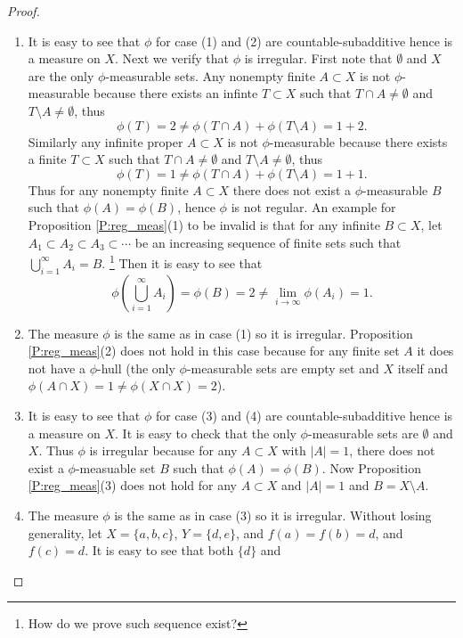 \begin{proof}
\begin{enumerate}
  \item It is easy to see that $\phi$ for case (1) and (2) are
    countable-subadditive hence is a measure on $X$. Next we verify that $\phi$
    is irregular. First note that $\emptyset$ and $X$ are the only
    $\phi$-measurable sets. Any nonempty finite $A\subset X$ is not
    $\phi$-measurable because there exists an infinte $T\subset X$ such that 
    $T\cap A\neq \emptyset$ and $T\setminus A\neq \emptyset$, thus 
    \[
      \phi(T)=2\neq \phi(T\cap A)+\phi(T\setminus A)=1+2.
    \]
    Similarly any infinite proper $A\subset X$ is not $\phi$-measurable because
    there exists a finite $T\subset X$ such that
    $T\cap A\neq \emptyset$ and $T\setminus A\neq \emptyset$, thus 
    \[
      \phi(T)=1\neq \phi(T\cap A)+\phi(T\setminus A)=1+1.
    \]
    Thus for any nonempty finite $A \subset X$ there does not exist a 
    $\phi$-measurable $B$ such that $\phi(A)=\phi(B)$, hence $\phi$ is not 
    regular.
    An example for Proposition \ref{P:reg_meas}(1) to be invalid is that for any 
    infinite $B\subset X$, let $A_1\subset A_2\subset A_3\subset\cdots$ be an
    increasing sequence of finite sets such that $\bigcup_{i=1}^{\infty}A_i=B$.
    \footnote{How do we prove such sequence exist?}
    Then it is easy to see that
    \[
      \phi(\bigcup_{i=1}^{\infty}A_i)=\phi(B)=2
        \neq \lim_{i\to\infty}\phi(A_i)=1.
    \]
  \item The measure $\phi$ is the same as in case (1) so it is irregular.
    Proposition \ref{P:reg_meas}(2) does not hold in this case because for any 
    finite set $A$ it does not have a $\phi$-hull (the only $\phi$-measurable 
    sets are empty set and $X$ itself and $\phi(A\cap X)=1\neq\phi(X\cap X)=2$).
  \item It is easy to see that $\phi$ for case (3) and (4) are
    countable-subadditive hence is a measure on $X$. It is easy to check
    that the only $\phi$-measurable sets are $\emptyset$ and $X$. Thus $\phi$ is
    irregular because for any $A\subset X$ with $|A|=1$, there does not exist a
    $\phi$-measuable set $B$ such that $\phi(A)=\phi(B)$.
    Now Proposition \ref{P:reg_meas}(3) does not hold for any $A\subset X$ and
    $|A|=1$ and $B=X\setminus A$.
  \item The measure $\phi$ is the same as in case (3) so it is irregular.
    Without losing generality, let $X=\{a,b,c\}$, $Y=\{d,e\}$, and
    $f(a)=f(b)=d$, and $f(c)=d$. It is easy to see that both $\{d\}$ and

\end{enumerate}
\end{proof}
